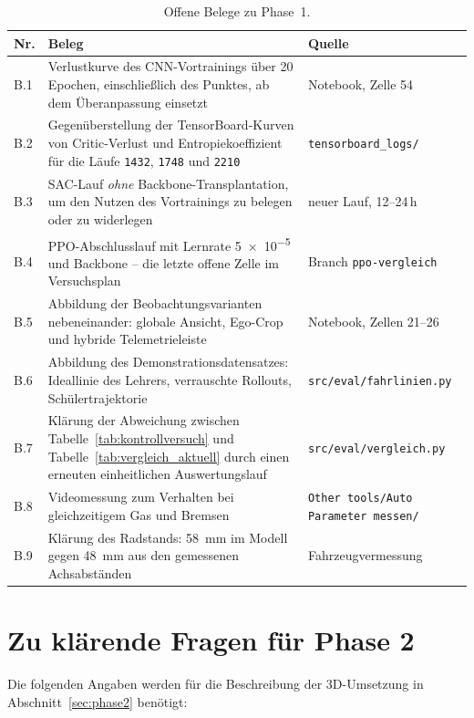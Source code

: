 \begin{table}[htbp]
  \centering
  \caption{Offene Belege zu Phase~1.}
  \label{tab:offene_belege}
  \small
  \begin{tabularx}{\linewidth}{@{}l X l@{}}
    \toprule
    \textbf{Nr.} & \textbf{Beleg} & \textbf{Quelle} \\
    \midrule
    B.1 & Verlustkurve des CNN-Vortrainings über \num{20} Epochen, einschließlich des Punktes, ab dem Überanpassung einsetzt & Notebook, Zelle 54 \\
    B.2 & Gegenüberstellung der TensorBoard-Kurven von Critic-Verlust und Entropiekoeffizient für die Läufe \texttt{1432}, \texttt{1748} und \texttt{2210} & \texttt{tensorboard\_logs/} \\
    B.3 & \ac{SAC}-Lauf \emph{ohne} Backbone-Transplantation, um den Nutzen des Vortrainings zu belegen oder zu widerlegen & neuer Lauf, 12--24\,h \\
    B.4 & \ac{PPO}-Abschlusslauf mit Lernrate \num{5e-5} und Backbone -- die letzte offene Zelle im Versuchsplan & Branch \texttt{ppo-vergleich} \\
    B.5 & Abbildung der Beobachtungsvarianten nebeneinander: globale Ansicht, Ego-Crop und hybride Telemetrieleiste & Notebook, Zellen 21--26 \\
    B.6 & Abbildung des Demonstrationsdatensatzes: Ideallinie des Lehrers, verrauschte Rollouts, Schülertrajektorie & \texttt{src/eval/fahrlinien.py} \\
    B.7 & Klärung der Abweichung zwischen Tabelle~\ref{tab:kontrollversuch} und Tabelle~\ref{tab:vergleich_aktuell} durch einen erneuten einheitlichen Auswertungslauf & \texttt{src/eval/vergleich.py} \\
    B.8 & Videomessung zum Verhalten bei gleichzeitigem Gas und Bremsen & \texttt{Other tools/Auto Parameter messen/} \\
    B.9 & Klärung des Radstands: \SI{58}{\milli\meter} im Modell gegen \SI{48}{\milli\meter} aus den gemessenen Achsabständen & Fahrzeugvermessung \\
    \bottomrule
  \end{tabularx}
\end{table}

\section{Zu klärende Fragen für Phase 2}

Die folgenden Angaben werden für die Beschreibung der 3D-Umsetzung in Abschnitt~\ref{sec:phase2} benötigt:

